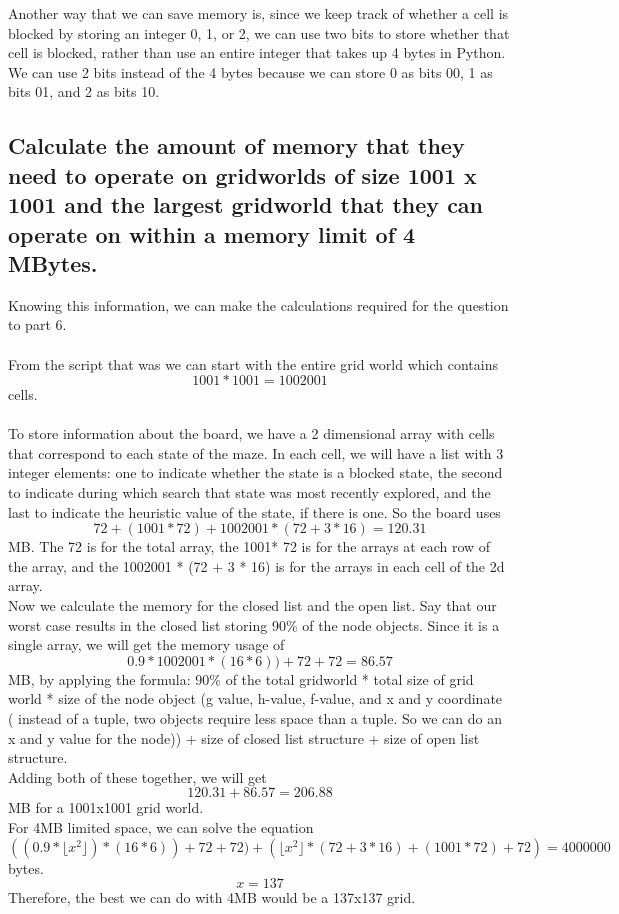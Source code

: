 \documentclass{article}
\begin{document}
Another way that we can save memory is, since we keep track of whether a cell is blocked by storing an integer 0, 1, or 2, we can use two bits to store whether that cell is blocked, rather than use an entire integer that takes up 4 bytes in Python. We can use 2 bits instead of the 4 bytes because we can store 0 as bits 00, 1 as bits 01, and 2 as bits 10. 


\subsection{Calculate the amount of memory that they need to operate on gridworlds of size 1001 x 1001 and the largest gridworld that they can operate on within a memory limit of 4 MBytes.}

Knowing this information, we can make the calculations required for the question to part 6.\\\\
From the script that was we can start with the entire grid world which contains\\
\[ 1001 * 1001 = 1002001 \] 
cells. \\\\
To store information about the board, we have a 2 dimensional array with cells that correspond to each state of the maze. In each cell, we will have a list with 3 integer elements: one to indicate whether the state is a blocked state, the second to indicate during which search that state was most recently explored, and the last to indicate the heuristic value of the state, if there is one. So the board uses
\[72 + (1001 * 72) + 1002001 * (72 + 3 * 16) = 120.31\]
MB. The 72 is for the total array, the 1001* 72 is for the arrays at each row of the array, and the 1002001 * (72 + 3 * 16)  is for the arrays in each cell of the 2d array. \\

Now we calculate the memory for the closed list and the open list. Say that our worst case results in the closed list storing 90\% of the node objects. Since it is a single array, we will get the memory usage of 
\[0.9 * 1002001 * (16 * 6)) + 72 +72 = 86.57 \]
MB, by applying the formula: 90\% of the total gridworld * total size of grid world * size of the node object (g value, h-value, f-value, and x and y coordinate ( instead of a tuple, two objects require less space than a tuple. So we can do an x and y value for the node)) + size of closed list structure + size of open list structure.\\

Adding both of these together, we will get 
\[120.31 + 86.57 = 206.88\]
MB for a 1001x1001 grid world.\\

For 4MB limited space, we can solve the equation\\
\[ ((0.9 * \lfloor x^2 \rfloor) * (16 * 6)) + 72+72) + (\lfloor x^2 \rfloor * (72 + 3 * 16) + (1001 * 72) + 72) = 4000000\]
 bytes.
\[x = 137\]
Therefore, the best we can do with 4MB would be a 137x137 grid.
\end{document}
